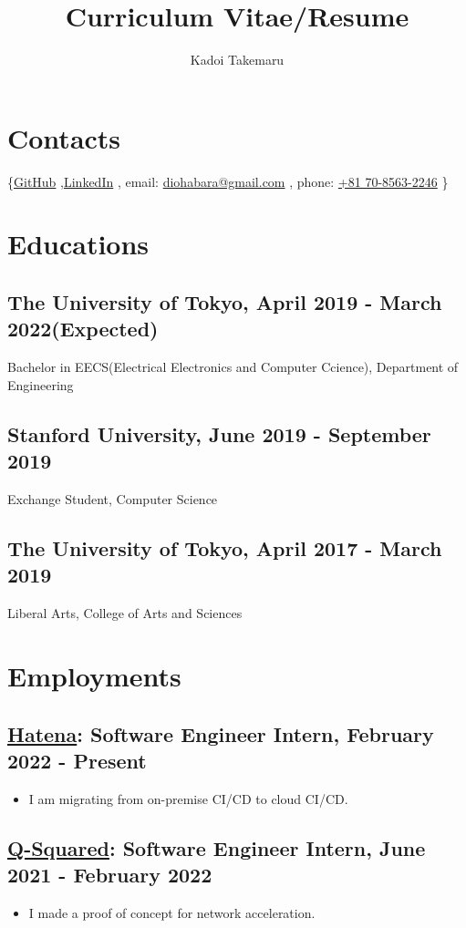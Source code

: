 \documentclass[12pt]{article}
\title{\vspace{-1cm}Curriculum Vitae/Resume}
\author{Kadoi Takemaru}
\date{}
\begin{document}

\section*{Contacts}
  \{\href{https://github.com/diohabara/}{GitHub}
    ,\href{https://www.linkedin.com/in/takemaru-kadoi-6950b5172/}{LinkedIn}
    , email: \href{mailto:diohabara@gmail.com}{diohabara@gmail.com}
    , phone: \href{tel:817085632246}{+81 70-8563-2246}
  \}

\section*{Educations}
  \subsection*{The University of Tokyo, April 2019 - March 2022(Expected)}
    Bachelor in EECS(Electrical Electronics and Computer Ccience), Department of Engineering
  \subsection*{Stanford University, June 2019 - September 2019}
    Exchange Student, Computer Science
  \subsection*{The University of Tokyo, April 2017 - March 2019}
    Liberal Arts, College of Arts and Sciences

\section*{Employments}
  \subsection*{\href{https://hatenacorp.jp/}{Hatena}: Software Engineer Intern, February 2022 - Present}
    \begin{itemize}
      \item I am migrating from on-premise CI/CD to cloud CI/CD.
    \end{itemize}
  \subsection*{\href{https://q-squared.jp}{Q-Squared}: Software Engineer Intern, June 2021 - February 2022}
    \begin{itemize}
      \item I made a proof of concept for network acceleration.
    \end{itemize}
\end{document}
